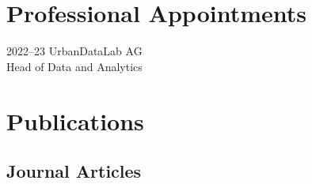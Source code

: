 \documentclass[12pt,a4paper]{report}
\begin{document}
    \section*{Professional Appointments}

    \begin{tablist}

        \item[2022--23] \tab{}UrbanDataLab AG \\
                            Head of Data and Analytics \\

    \end{tablist}

    \section*{Publications}

    \subsection*{Journal Articles}
\end{document}
